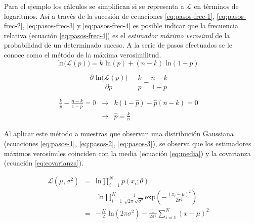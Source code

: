\documentclass[a4paper]{article}
\begin{document}
Para el ejemplo los cálculos se simplifican si se representa a $\mathcal{L}$ en términos de logaritmos.
Así a través de la sucesión de ecuaciones \ref{eq:pasos-frec-1}, \ref{eq:pasos-frec-2}, \ref{eq:pasos-frec-3} y \ref{eq:pasos-frec-4} es posible indicar que la frecuencia relativa (ecuación \ref{eq:pasos-frec-4}) es el \emph{estimador máximo verosimil} de la probabilidad de un determinado suceso.
A la serie de pasos efectuados se le conoce como el método de la máxima verosimilitud.
\begin{equation}
\text{ln} \big (\mathcal{L}(p) \big) = k \text{ ln}(p) + (n-k) \text{ ln}(1-p)
\label{eq:pasos-frec-1}
\end{equation}

\begin{equation}
\frac{\partial \text{ ln}\big ( \mathcal{L}(p)  \big )}{\partial p} = \frac{k}{p} - \frac{n-k}{1-p}
\label{eq:pasos-frec-2}
\end{equation}


\begin{eqnarray}
\frac{k}{\hat{p}} - \frac{n-k}{1-\hat{p}} = 0 &\to& k(1-\hat{p}) - \hat{p}(n-k) = 0 \label{eq:pasos-frec-3}\\ &\to& \hat{p} = \frac{k}{n}
\label{eq:pasos-frec-4}
\end{eqnarray}



Al aplicar este método a muestras que observan una distribución Gaussiana (ecuaciones \ref{eq:pasos-1}, \ref{eq:pasos-2}, \ref{eq:pasos-3}), se observa que los estimadores máximos verosímiles coinciden con la media (ecuación \ref{eq:media}) y la covarianza (ecuación \ref{eq:covarianza}).

\begin{eqnarray}
\mathcal{L}(\mu,\sigma ^2) &=& \text{ln}\prod_{i=1}^N p(x_i;\theta) \label{eq:pasos-1} \\ &=& \text{ ln}\prod_{i=1}^N \frac{1}{\sqrt{2 \pi}\sqrt{\sigma ^2}} \text{exp} \left ( -\frac{(x_i - \mu)^2}{2 \sigma ^2}  \right ) \label{eq:pasos-2} \\ &=&
-\frac{N}{2} \text{ ln}(2\pi \sigma ^2) - \frac{1}{2 \sigma ^2} \sum_{i=1}^{N}(x - \mu)^2 \label{eq:pasos-3}
\end{eqnarray}
\end{document}
